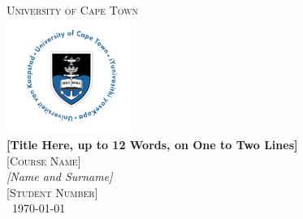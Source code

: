 \documentclass[11pt]{article} %
\begin{document}
	
	
	\begin{titlepage} %
		\newcommand{\HRule}{\rule{\linewidth}{0.2mm}} %
		
		\center %
		
		\textsc{\LARGE University of Cape Town}\\[0.2cm] %
		
		\includegraphics[width=0.3\textwidth]{Images/uct}\\[0.2cm] %
		
		{\huge\bfseries [Title Here, up to 12 Words, on One to Two Lines] }\\[0.4cm] %
		
		\textsc{\Large [Course Name]}\\[0.5cm] %
		
		{\large\textit{[Name and Surname]}}\\ %
		\textsc{[Student Number]} \\[0.5cm] %
		
		{\large\ \today} %
		

\end{titlepage}
\end{document}
